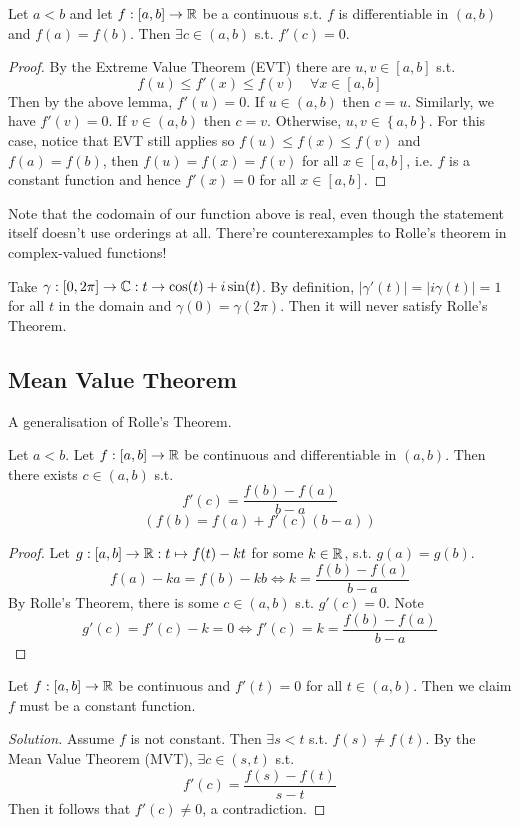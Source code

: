 \begin{theorem}
  Let $a<b$ and let $f:[a,b]\to\mathbb R$ be a continuous s.t. $f$ is differentiable in $(a,b)$
  and $f(a)=f(b)$. Then $\exists c\in (a,b)$ s.t. $f'(c)=0$.
  \label{<+label+>}
\end{theorem}
\begin{proof}
  By the Extreme Value Theorem (EVT) there are $u,v\in[a,b]$ s.t. 
  \[f(u)\leq f'(x) \leq f(v) \quad \forall x\in [a,b]\]
  Then by the above lemma, $f'(u)=0$. If $u\in (a,b)$ then $c=u$.
  Similarly, we have $f'(v)=0$. If $v\in (a,b)$ then $c=v$. Otherwise, $u,v\in \left\{
  a,b \right\}$. For this case, notice that EVT still applies so $f(u)\leq f(x)\leq f(v)$
  and $f(a)=f(b)$, then $f(u)=f(x)=f(v)$ for all $x\in [a,b]$, i.e. $f$ is a constant
  function and hence $f'(x)=0$ for all $x\in[a,b]$. 
\end{proof}
Note that the codomain of our function above is real, even though the statement itself
doesn't use orderings at all. There're counterexamples to Rolle's theorem in
complex-valued functions!
\begin{example}
  Take $\gamma:[0,2\pi]\to\mathbb C:t\to \cos(t)+i\sin(t)$. By definition,
  $|\gamma'(t)|=|i\gamma(t)| =1$ for all $t$ in the domain and $\gamma(0)=\gamma(2\pi)$.
  Then it will never satisfy Rolle's Theorem.
\end{example}

\subsection{Mean Value Theorem}
A generalisation of Rolle's Theorem.
\begin{theorem}
  Let $a<b$. Let $f:[a,b]\to\mathbb R$ be continuous and differentiable in $(a,b)$. Then there
  exists $c\in(a,b)$ s.t. 
  \[f'(c)= \frac{f(b)-f(a)}{b-a}\]
  \[\left( f(b)=f(a)+f'(c)(b-a) \right)\]
  \label{<+label+>}
\end{theorem}
\begin{proof}
  Let $g:[a,b]\to\mathbb R:t\mapsto f(t)-kt$ for some $k\in\mathbb R$, s.t. $g(a)=g(b)$.
  \[f(a)-ka = f(b)-kb \iff k= \frac{f(b)-f(a)}{b-a}\]
  By Rolle's Theorem, there is some $c\in(a,b)$ s.t. $g'(c)=0$. Note
  \[g'(c)=f'(c)-k=0 \iff f'(c)=k=\frac{f(b)-f(a)}{b-a}\]
\end{proof}

\begin{example}
  Let $f:[a,b]\to\mathbb R$ be continuous and $f'(t)=0$ for all $t\in(a,b)$. Then we claim $f$
  must be a constant function. 
\end{example}
\begin{proof}[Solution]
   Assume $f$ is not constant. Then $\exists s<t$ s.t. $f(s)\neq f(t)$. By the Mean Value
   Theorem (MVT), $\exists c\in(s,t)$ s.t. 
   \[f'(c)=\frac{f(s)-f(t)}{s-t}\]
   Then it follows that $f'(c)\neq 0$, a contradiction.
\end{proof}


